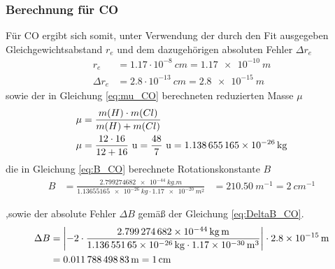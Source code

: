 \subsubsection*{Berechnung für CO}
Für CO ergibt sich somit, unter Verwendung der durch den Fit ausgegeben Gleichgewichtsabstand $r_e$ und dem dazugehörigen absoluten Fehler $\Delta r_e$
\begin{align}
\label{eq:r_CO}
r_e &= 1.17 \cdot 10^{-8} ~\si{cm}=\SI[mode=math]{1.17e-10}{m}
\\
\Delta r_e &= 2.8 \cdot 10^{-13} ~\si{cm}=\SI[mode=math]{2.8e-15}{m}
\end{align}
 sowie der in Gleichung \ref{eq:mu_CO} berechneten reduzierten Masse $\mu$
\begin{align}
\mu&= \frac{m(H)\cdot m(Cl)}{m(H)+m(Cl)}\notag\\
\mu&= \frac{12\cdot16}{12+16} ~\si{u}=\frac{48}{7}~\si{u}=\SI[mode=math]{1.138655165e-26}{kg}\label{eq:mu_CO}
\end{align}
die in Gleichung \ref{eq:B_CO} berechnete Rotationskonstante $B$
\begin{align}
\label{eq:B_CO}
B &=\frac{\SI[mode=math]{2.799274682e-44}{kg.m}}{\SI[mode=math]{1.13655165e-26}{kg}\cdot\SI[mode=math]{1.17e-20}{m^{2}}}
&=\SI[mode=math]{210.50}{m^{-1}}
=\SI[mode=math]{2}{cm^{-1}}
\end{align}


,sowie der absolute Fehler $\Delta B$ gemäß der  Gleichung \ref{eq:DeltaB_CO}.  
\begin{align}
\Delta B &= \left|-2\cdot \frac{\SI[mode=math]{2.799274682e-44}{kg.m}}{\SI[mode=math]{1.13655165e-26}{kg}\cdot\SI[mode=math]{1.17e-30}{m^{3}}}\right| \cdot \SI[mode=math]{2.8e-15}{m}
\notag\\
&=\SI[mode=math]{0.01178849883 }{m} = \SI[mode=math]{1}{cm}   \label{eq:DeltaB_CO}
\end{align} 









 





